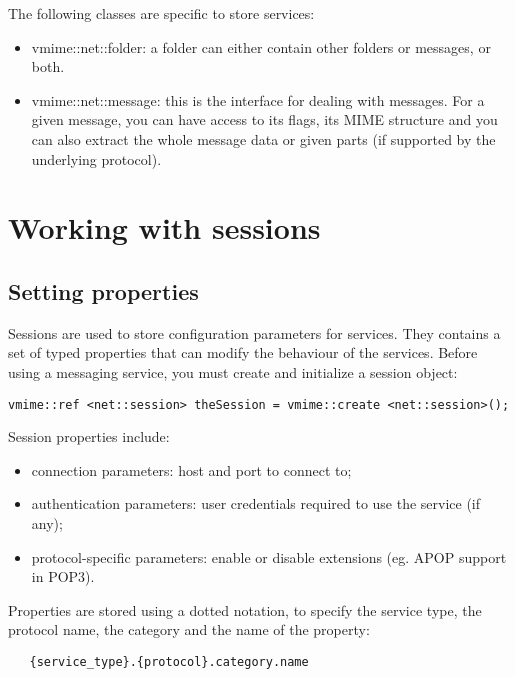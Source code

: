 The following classes are specific to store services:

\begin{itemize}
\item {\vcode vmime::net::folder}: a folder can either contain other folders
or messages, or both.

\item {\vcode vmime::net::message}: this is the interface for dealing with
messages. For a given message, you can have access to its flags, its MIME
structure and you can also extract the whole message data or given parts (if
supported by the underlying protocol).
\end{itemize}


\section{Working with sessions}

\subsection{Setting properties} %

Sessions are used to store configuration parameters for services. They
contains a set of typed properties that can modify the behaviour of the
services. Before using a messaging service, you must create and
initialize a session object:

\begin{lstlisting}
vmime::ref <net::session> theSession = vmime::create <net::session>();
\end{lstlisting}

Session properties include:

\begin{itemize}
\item connection parameters: host and port to connect to;
\item authentication parameters: user credentials required to use the
service (if any);
\item protocol-specific parameters: enable or disable extensions (eg. APOP
support in POP3).
\end{itemize}

Properties are stored using a dotted notation, to specify the service type,
the protocol name, the category and the name of the property:

\begin{verbatim}
   {service_type}.{protocol}.category.name
\end{verbatim}

